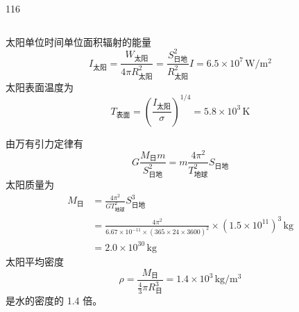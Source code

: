 \begin{solution}{116}
\begin{subsolution}
\begin{subsubsolution}
\begin{equation}
                \label{eq:15.s116}
            \end{equation}
        \end{subsubsolution}
        \begin{subsubsolution}
            太阳单位时间单位面积辐射的能量
            \begin{equation}
                I_{\text{太阳}} = \frac{W_{\text{太阳}}}{4\pi R_{\text{太阳}}^{2}} = \frac{S_{\text{日地}}^{2}}{R_{\text{太阳}}^{2}} I = 6.5 \times 10^{7} \,\mathrm{W/m^{2}}
            \end{equation}
            太阳表面温度为
            \begin{equation}
                T_{\text{表面}} = \left(\frac{I_{\text{太阳}}}{\sigma}\right)^{1/4} = 5.8 \times 10^{3} \,\mathrm{K}
                \label{eq:16.s116}
            \end{equation}
        \end{subsubsolution}
    \end{subsolution}
    \begin{subsolution}
        \begin{subsubsolution}
            由万有引力定律有
            \begin{equation}
                G \frac{M_{\text{日}} m}{S_{\text{日地}}^{2}} = m \frac{4\pi^{2}}{T_{\text{地球}}^{2}} S_{\text{日地}}
            \end{equation}
            太阳质量为
            \begin{equation}
                \begin{aligned}
                    M_{\text{日}} &= \frac{4\pi^{2}}{G T_{\text{地球}}^{2}} S_{\text{日地}}^{3} \\
                    &= \frac{4\pi^{2}}{6.67 \times 10^{-11} \times (365 \times 24 \times 3600)^{2}} \times (1.5 \times 10^{11})^{3} \,\mathrm{kg} \\
                    &= 2.0 \times 10^{30} \,\mathrm{kg}
                \end{aligned}
                \label{eq:17.s116}
            \end{equation}
            太阳平均密度
            \begin{equation}
                \rho = \frac{M_{\text{日}}}{\frac{4}{3}\pi R_{\text{日}}^{3}} = 1.4 \times 10^{3} \,\mathrm{kg/m^{3}}
                \label{eq:18.s116}
            \end{equation}
            是水的密度的 1.4 倍。
        \end{subsubsolution}
        \begin{subsubsolution}

\end{subsubsolution}
\end{subsolution}
\end{solution}
